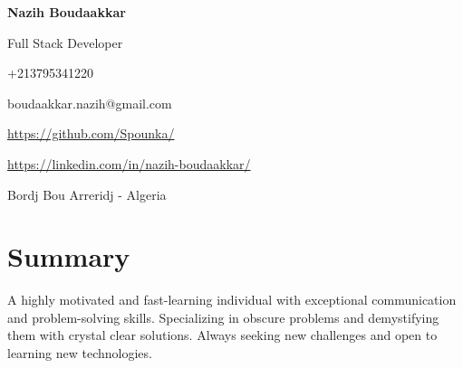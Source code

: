 \documentclass[a4paper,11pt]{article}
\makeatletter
\newcommand{\name}{Nazih Boudaakkar} %
\newcommand{\course}{Full Stack Developer} %
\newcommand{\phone}{795341220} %
\newcommand{\emaila}{{boudaakkar.nazih@gmail.com}} %
\newcommand{\address}{{Bordj Bou Arreridj - Algeria }} %
\newcommand{\github}{\url{https://github.com/Spounka/}}
\newcommand{\linkedIn}{\url{https://linkedin.com/in/nazih-boudaakkar/}}
\makeatother
\begin{document}
{}\selectfont


\centering
\textbf{\Large{\name}}

\course

\vspace*{2.5mm}
+213\phone

\emaila
\hspace*{1mm}

\github
\hspace*{1mm}

\linkedIn
\hspace*{1mm}

\address

\vspace{-3mm}
\section{\textbf{Summary}}
\vspace{1mm}
\raggedright
A highly motivated and fast-learning individual with exceptional communication and problem-solving skills. Specializing in obscure problems and demystifying them with crystal clear solutions. Always seeking new challenges and open to learning new technologies.





\vspace{-5mm}

\vspace{-5mm}

\vspace{-5mm}

\vspace{-5mm}


\end{document}
